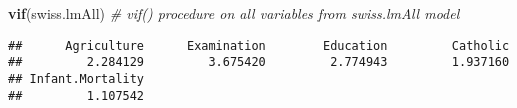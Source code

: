 \documentclass[]{article}
\newenvironment{Shaded}{\begin{snugshade}}{\end{snugshade}}
\newcommand{\CommentTok}[1]{\textcolor[rgb]{0.56,0.35,0.01}{\textit{#1}}}
\newcommand{\KeywordTok}[1]{\textcolor[rgb]{0.13,0.29,0.53}{\textbf{#1}}}
\newcommand{\NormalTok}[1]{#1}
\begin{document}
\begin{Shaded}
\begin{Highlighting}[]
\KeywordTok{vif}\NormalTok{(swiss.lmAll) }\CommentTok{# vif() procedure on all variables from swiss.lmAll model}
\end{Highlighting}
\end{Shaded}

\begin{verbatim}
##      Agriculture      Examination        Education         Catholic 
##         2.284129         3.675420         2.774943         1.937160 
## Infant.Mortality 
##         1.107542
\end{verbatim}
\end{document}
